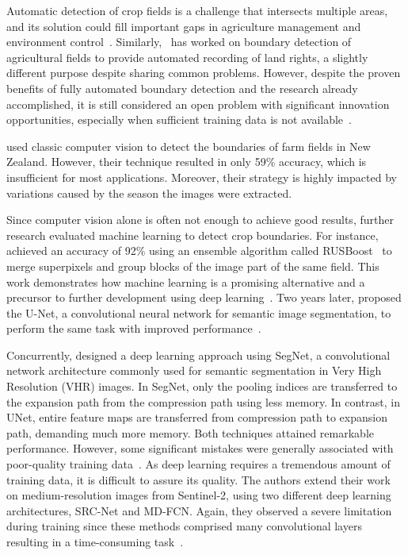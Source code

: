 \documentclass[12pt]{article}
\begin{document}
Automatic detection of crop fields is a challenge that intersects multiple areas, and its solution could fill important gaps in agriculture management and environment control~\citep{bolfe2020}. Similarly,~\citet{crommelinck2019} has worked on boundary detection of agricultural fields to provide automated recording of land rights, a slightly different purpose despite sharing common problems. However, despite the proven benefits of fully automated boundary detection and the research already accomplished, it is still considered an open problem with significant innovation opportunities, especially when sufficient training data is not available~\citep{waldner2021,yang2020}.

\citet{north2019} used classic computer vision to detect the boundaries of farm fields in New Zealand. However, their technique resulted in only 59\% accuracy, which is insufficient for most applications. Moreover, their strategy is highly impacted by variations caused by the season the images were extracted.


Since computer vision alone is often not enough to achieve good results, further research evaluated machine learning to detect crop boundaries. For instance, \citet{garcia2017} achieved an accuracy of 92\% using an ensemble algorithm called RUSBoost~\citep{seiffert2010} to merge superpixels and group blocks of the image part of the same field. This work demonstrates how machine learning is a promising alternative and a precursor to further development using deep learning~\citep{garcia2017}. Two years later, \citet{garcia2019} proposed the U-Net, a convolutional neural network for semantic image segmentation, to perform the same task with improved performance~\cite{garcia2017,garcia2018,garcia2019}.

Concurrently, \citet{persello2019} designed a deep learning approach using SegNet, a convolutional network architecture commonly used for semantic segmentation in Very High Resolution (VHR) images. In SegNet, only the pooling indices are transferred to the expansion path from the compression path using less memory. In contrast, in UNet, entire feature maps are transferred from compression path to expansion path, demanding much more memory. Both techniques attained remarkable performance. However, some significant mistakes were generally associated with poor-quality training data~\citep{persello2019}. As deep learning requires a tremendous amount of training data, it is difficult to assure its quality. The authors extend their work on medium-resolution images from Sentinel-2, using two different deep learning architectures, SRC-Net and MD-FCN. Again, they observed a severe limitation during training since these methods comprised many convolutional layers resulting in a time-consuming task~\cite{persello2019,masoud2020}.
\end{document}
